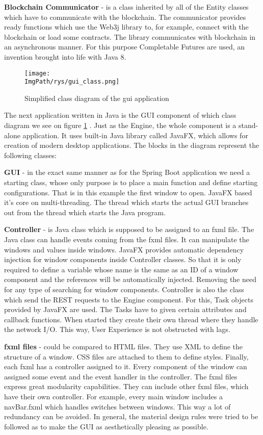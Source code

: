 \documentclass[a4paper,12pt,twoside,openany]{report}
\newcommand{\ImgPath}{.}
\begin{document}
\textbf{Blockchain Communicator} - is a class inherited by all of the Entity classes which have to communicate with the blockchain. The communicator provides ready functions which use the Web3j library to, for example, connect with the blockchain or load some contracts. The library communicates with blockchain in an asynchronous manner. For this purpose Completable Futures are used, an invention brought into life with Java 8.

\begin{figure}[!htbp]
	\begin{center}
\centering
\texttt{[image: \\ImgPath/rys/gui\_class.png]}
\end{center}
	\caption{Simplified class diagram of the gui application}
	\label{gui class}
\end{figure}

The next application written in Java is the GUI component of which class diagram we see on figure \ref{gui class} . Just as the Engine, the whole component is a stand-alone application. It uses built-in Java library called JavaFX, which allows for creation of modern desktop applications. The blocks in the diagram represent the following classes:

\textbf{GUI} - in the exact same manner as for the Spring Boot application we need a starting class, whose only purpose is to place a main function and define starting configurations. That is in this example the first window to open. JavaFX based it's core on multi-threading. The thread which starts the actual GUI branches out from the thread which starts the Java program.

\textbf{Controller} - is Java class which is supposed to be assigned to an fxml file. The Java class can handle events coming from the fxml files. It can manipulate the windows and values inside windows. JavaFX provides automatic dependency injection for window components inside Controller classes. So that it is only required to define a variable whose name is the same as an ID of a window component and the references will be automatically injected. Removing the need for any type of searching for window components. Controller is also the class which send the REST requests to the Engine component. For this, Task objects provided by JavaFX are used. The Tasks have to given certain attributes and callback functions. When started they create their own thread where they handle the network I/O. This way, User Experience is not obstructed with lags.

\textbf{fxml files} - could be compared to HTML files. They use XML to define the structure of a window. CSS files are attached to them to define styles. Finally, each fxml has a controller assigned to it. Every component of the window can assigned some event and the event handler in the controller. The fxml files express great modularity capabilities. They can include other fxml files, which have their own controller. For example, every main window includes a navBar.fxml which handles switches between windows. This way a lot of redundancy can be avoided. In general, the material design rules were tried to be followed as to make the GUI as aesthetically pleasing as possible.
\end{document}
